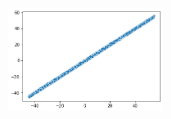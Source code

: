 \begin{problema}
\begin{enumerate}
\begin{sol}
\begin{figure}[H]
\begin{subfigure}{.5\textwidth}
				\end{subfigure}%
				\begin{subfigure}{.5\textwidth}
					\centering
					\includegraphics[width=0.45\textwidth]{Images/1.2}
				\end{subfigure}
			\end{figure}
		\end{sol}
	\end{enumerate}
\end{problema}

